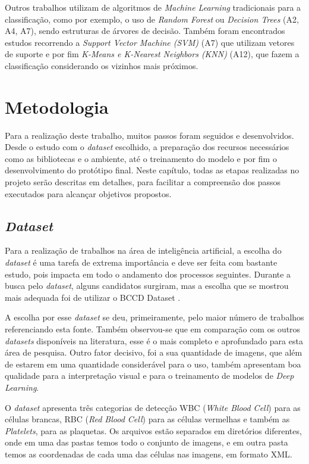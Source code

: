 Outros trabalhos utilizam de algoritmos de \emph{Machine Learning} tradicionais para a classificação, como por exemplo, o uso de \emph{Random Forest} ou \emph{Decision Trees}  (A2, A4, A7), sendo estruturas de árvores de decisão. Também foram encontrados estudos recorrendo a \emph{Support Vector Machine (SVM)} (A7) que utilizam vetores de suporte e por fim \emph{K-Means e K-Nearest Neighbors (KNN)} (A12), que fazem a classificação considerando os vizinhos mais próximos.

\chapter{Metodologia}
\label{chap:metodologia}

Para a realização deste trabalho, muitos passos foram seguidos e desenvolvidos. Desde o estudo com o \emph{dataset} escolhido, a preparação dos recursos necessários como as bibliotecas e o ambiente, até o treinamento do modelo e por fim o desenvolvimento do protótipo final. Neste capítulo, todas as etapas realizadas no projeto serão descritas em detalhes, para facilitar a compreensão dos passos executados para alcançar objetivos propostos.

\section{\emph{Dataset}}
Para a realização de trabalhos na área de inteligência artificial, a escolha do \emph{dataset} é uma tarefa de extrema importância e deve ser feita com bastante estudo, pois impacta em todo o andamento dos processos seguintes. Durante a busca pelo \emph{dataset}, alguns candidatos surgiram, mas a escolha que se mostrou mais adequada foi de utilizar o BCCD Dataset \cite{datasetBCCD}.

A escolha por esse \emph{dataset} se deu, primeiramente, pelo maior número de trabalhos referenciando esta fonte. Também observou-se que em comparação com os outros \emph{datasets} disponíveis na literatura, esse é o mais completo e aprofundado para esta área de pesquisa. Outro fator decisivo, foi a sua quantidade de imagens, que além de estarem em uma quantidade considerável para o uso, também apresentam boa qualidade para a interpretação visual e para o treinamento de modelos de \emph{Deep Learning}.

O \emph{dataset} apresenta três categorias de detecção WBC (\emph{White Blood Cell}) para as células brancas, RBC (\emph{Red Blood Cell}) para as células vermelhas e também as \emph{Platelets}, para as plaquetas. Os arquivos estão separados em diretórios diferentes, onde em uma das pastas temos todo o conjunto de imagens, e em outra pasta temos as coordenadas de cada uma das células nas imagens, em formato XML.

